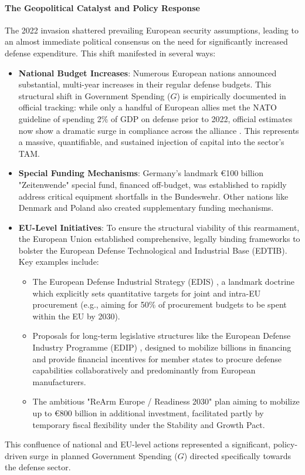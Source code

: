 \paragraph{The Geopolitical Catalyst and Policy Response}
The 2022 invasion shattered prevailing European security assumptions, leading to an almost immediate political consensus on the need for significantly increased defense expenditure. This shift manifested in several ways:
\begin{itemize}
    \item \textbf{National Budget Increases}: Numerous European nations announced substantial, multi-year increases in their regular defense budgets. This structural shift in Government Spending ($G$) is empirically documented in official tracking: while only a handful of European allies met the NATO guideline of spending 2\% of GDP on defense prior to 2022, official estimates now show a dramatic surge in compliance across the alliance \parencite{nato2024expenditure}. This represents a massive, quantifiable, and sustained injection of capital into the sector's TAM.
    \item \textbf{Special Funding Mechanisms}: Germany's landmark €100 billion "Zeitenwende" special fund, financed off-budget, was established to rapidly address critical equipment shortfalls in the Bundeswehr. Other nations like Denmark and Poland also created supplementary funding mechanisms.
    \item \textbf{EU-Level Initiatives}: To ensure the structural viability of this rearmament, the European Union established comprehensive, legally binding frameworks to bolster the European Defense Technological and Industrial Base (EDTIB). Key examples include:
          \begin{itemize}
              \item The European Defense Industrial Strategy (EDIS) \parencite{ec2024edis}, a landmark doctrine which explicitly sets quantitative targets for joint and intra-EU procurement (e.g., aiming for 50\% of procurement budgets to be spent within the EU by 2030).
              \item Proposals for long-term legislative structures like the European Defense Industry Programme (EDIP) \parencite{ec2024edip}, designed to mobilize billions in financing and provide financial incentives for member states to procure defense capabilities collaboratively and predominantly from European manufacturers.
              \item The ambitious "ReArm Europe / Readiness 2030" plan aiming to mobilize up to €800 billion in additional investment, facilitated partly by temporary fiscal flexibility under the Stability and Growth Pact.
          \end{itemize}
\end{itemize}
This confluence of national and EU-level actions represented a significant, policy-driven surge in planned Government Spending (\(G\)) directed specifically towards the defense sector.

